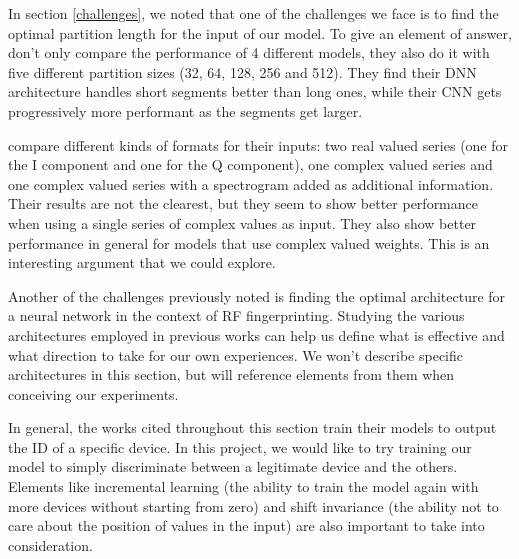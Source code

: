 In section \ref{challenges}, we noted that one of the challenges we face is to find the optimal partition length for the input of our model. To give an element of answer, \textcite{youssef_machine_2017} don't only compare the performance of 4 different models, they also do it with five different partition sizes (32, 64, 128, 256 and 512). They find their DNN architecture handles short segments better than long ones, while their CNN gets progressively more performant as the segments get larger.

\textcite{stankowicz_complex_2019} compare different kinds of formats for their inputs: two real valued series (one for the I component and one for the Q component), one complex valued series and one complex valued series with a spectrogram added as additional information. Their results are not the clearest, but they seem to show better performance when using a single series of complex values as input. They also show better performance in general for models that use complex valued weights. This is an interesting argument that we could explore.

Another of the challenges previously noted is finding the optimal architecture for a neural network in the context of RF fingerprinting. Studying the various architectures employed in previous works can help us define what is effective and what direction to take for our own experiences. We won't describe specific architectures in this section, but will reference elements from them when conceiving our experiments.

In general, the works cited throughout this section train their models to output the ID of a specific device. In this project, we would like to try training our model to simply discriminate between a legitimate device and the others. Elements like incremental learning (the ability to train the model again with more devices without starting from zero) and shift invariance (the ability not to care about the position of values in the input) are also important to take into consideration.
